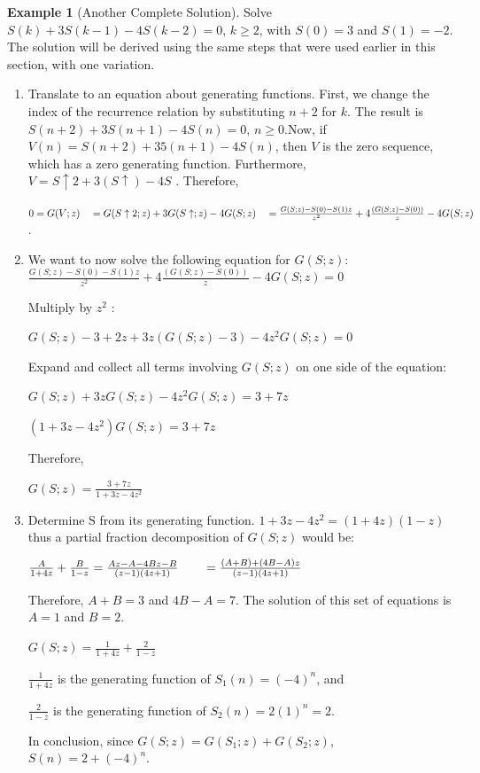 \documentclass[10pt,]{book}
\theoremstyle{plain}
\theoremstyle{definition}
\theoremstyle{definition}
\theoremstyle{definition}
\newtheorem{example}[theorem]{Example}
\theoremstyle{definition}
\numberwithin{equation}{section}
\begin{document}
\begin{example}[Another Complete Solution]\label{ex-another-complete-solution}
 Solve \(S(k) + 3S(k - 1) - 4S(k -2) = 0\), \(k\geq 2\), with \(S(0) = 3\) and \(S(1) = -2\). The solution will be derived using the same steps that were used earlier in this section, with one variation.%
\par
\leavevmode%
\begin{enumerate}[label=\arabic*]
\item\hypertarget{li-99}{}Translate to an equation about generating functions. First, we change the index of the recurrence relation by substituting \(n + 2\) for \(k\).
The result is \(S(n + 2) + 3S(n + 1) - 4S(n) = 0\), \(n \geq  0\).Now, if \(V(n) = S(n + 2) + 35 (n + 1) - 4S(n)\), then \(V\) is the zero
sequence, which has a zero generating function. Furthermore, \(V = S\uparrow 2+3(S\uparrow )-4 S\) . Therefore,

\(0 = G(V;z) \\
\\
\quad = G(S\uparrow 2; z) + 3 G(S\uparrow ;z) - 4G(S;z) \\
\\
\quad = \frac{G(S;z) - S(0) - S(1)z }{z^2}+4 \frac{(G(S;z) - S(0))}{z} - 4G(S;z)\).%
\item\hypertarget{li-100}{}We want to now solve the following equation for \(G(S;z)\):
 \(\frac{G(S;z) - S(0) - S(1)z }{z^2}+4 \frac{(G(S;z) - S(0))}{z} - 4G(S;z) = 0\)

Multiply by \(z^2\) :

\(G(S;z) - 3 + 2z + 3z(G(S;z) - 3) - 4z^2 G(S;z) = 0\)

Expand and collect all terms involving \(G(S;z)\) on one side of the equation:

\(G(S;z) + 3z G(S;z) - 4z^2 G(S;z) = 3 + 7z\) 

\((1 + 3z - 4z^2 )G(S;z)= 3 + 7z\) 

Therefore,

\(G(S;z)= \frac{3+7z}{1 + 3z - 4z^2}\)%
\item\hypertarget{li-101}{} Determine S from its generating function.
 \(1 + 3z - 4z^2 = (1 + 4z) (1 - z)\)
thus a partial fraction decomposition of \(G(S;z)\) would be:

\(\frac{A}{1+4z}+ \frac{B}{1-z}=\frac{A z-A-4 B z-B}{(z-1) (4 z+1)}\\
\\
\quad \quad =\frac{(A+B)+(4B-A)z}{(z-1) (4 z+1)}\)

Therefore, \(A + B = 3\) and \(4B - A = 7\). The solution of this set of equations is \(A = 1\) and \(B = 2\).

\(G(S;z)= \frac{1}{1+4z}+ \frac{2}{1-z}\)

\(\frac{1}{1+4z}\) is the generating function of \(S_1(n)=(-4)^n\), and

\(\frac{2}{1-z}\) is the generating function of \(S_2(n) = 2(1)^n = 2\).

In conclusion, since \(G(S;z) = G(S_1;z) + G(S _2;z)\), \(S(n) = 2 + (-4)^n\).
%
\end{enumerate}
%
\end{example}
\end{document}
